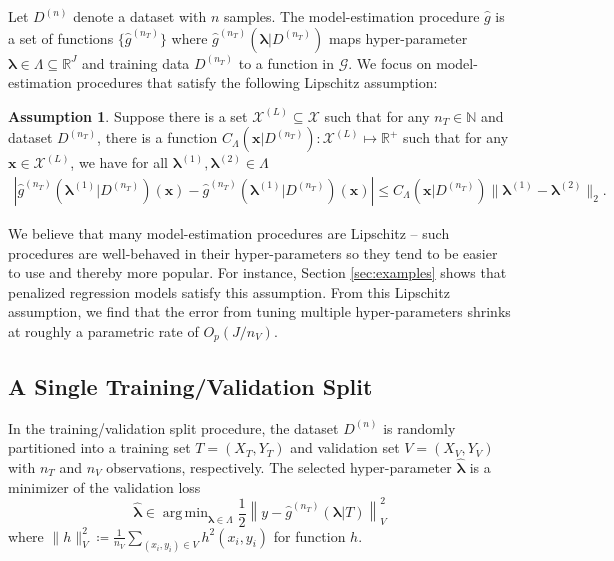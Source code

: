 \documentclass[12pt]{article} %
\theoremstyle{definition}
\newtheorem{assump}{Assumption}
\DeclareMathOperator*{\argmin}{arg\,min}
\begin{document}
Let $D^{(n)}$ denote a dataset with $n$ samples. The model-estimation procedure $\hat{g}$ is a set of functions $\{\hat{g}^{(n_T)}\}$ where $\hat{g}^{(n_T)}(\boldsymbol{\lambda} | D^{(n_T)})$ maps hyper-parameter $\boldsymbol{\lambda} \in \Lambda \subseteq \mathbb{R}^J$ and training data $D^{(n_T)}$ to a function in $\mathcal{G}$.
We focus on model-estimation procedures that satisfy the following Lipschitz assumption:
\begin{assump}
	\label{assump:lipschitz}
	Suppose there is a set $\mathcal{X}^{(L)} \subseteq \mathcal{X}$ such that for any $n_T \in \mathbb{N}$ and dataset $D^{(n_T)}$, there is a function $C_\Lambda(\boldsymbol{x} | D^{(n_T)}) : \mathcal{X}^{(L)} \mapsto \mathbb{R}^+$ such that for any $\boldsymbol{x} \in \mathcal{X}^{(L)}$, we have for all $\boldsymbol{\lambda}^{(1)}, \boldsymbol{\lambda}^{(2)} \in \Lambda$
	\begin{align}
	\left |
	\hat{g}^{(n_T)}(\boldsymbol{\lambda}^{(1)}|D^{(n_T)})(\boldsymbol{x}) - \hat{g}^{(n_T)}(\boldsymbol{\lambda}^{(1)}|D^{(n_T)})(\boldsymbol{x}) \right |
	\le C_\Lambda(\boldsymbol{x}|D^{(n_T)}) \|\boldsymbol{\lambda}^{(1)} - \boldsymbol{\lambda}^{(2)}\|_2.
	\end{align}
\end{assump}
\noindent
We believe that many model-estimation procedures are Lipschitz -- such procedures are well-behaved in their hyper-parameters so they tend to be easier to use and thereby more popular.
For instance, Section \ref{sec:examples} shows that penalized regression models satisfy this assumption.
From this Lipschitz assumption, we find that the error from tuning multiple hyper-parameters shrinks at roughly a parametric rate of $O_p(J/n_V)$.

\subsection{A Single Training/Validation Split}\label{sec:single}

In the training/validation split procedure, the dataset $D^{(n)}$ is randomly partitioned into a training set $T = (X_T, Y_T)$ and validation set $V = (X_V, Y_V)$ with $n_T$ and $n_V$ observations, respectively.
The selected hyper-parameter $\hat{\boldsymbol{\lambda}}$ is a minimizer of the validation loss
\begin{equation}
\label{eq:train_val_lambda}
\hat{\boldsymbol \lambda} \in \argmin_{\boldsymbol{\lambda} \in\Lambda} \frac{1}{2} \left \| y-\hat{g}^{(n_T)}( \boldsymbol \lambda | T) \right \|_{V}^{2}
\end{equation}
where $\| h \|^2_{V} \coloneqq \frac{1}{n_V}\sum_{(x_i, y_i)\in V} h^2(x_i, y_i)$ for function $h$.
\end{document}
